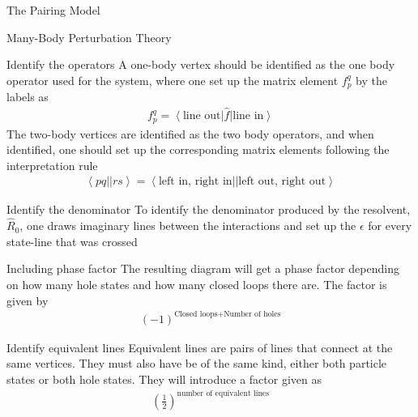 \documentclass[twoside,english]{uiofysmaster}
\begin{document}
\begin{chapter}{The Pairing Model}
\begin{section}{Many-Body Perturbation Theory}
		\begin{subsection}{Identify the operators}
			A one-body vertex should be identified as the one body operator used for the system, where one set up the matrix element $f_p^q$ by the labels as
			\begin{align}
				f_p^q = \left< \text{line out} \right| \hat f \left| \text{line in} \right>
			\end{align}
			The two-body vertices are identified as the two body operators, and when identified, one should set up the corresponding matrix elements following the interpretation rule
			\begin{align}
				\left< pq || rs \right> = \left< \text{left in, right in} || \text{left out, right out} \right> 
			\end{align}
		\end{subsection}

		\begin{subsection}{Identify the denominator}
			To identify the denominator produced by the resolvent, $\hat R_0$, one draws imaginary lines between the interactions and set up the $\epsilon$ for every state-line that was crossed 
		\end{subsection}

		\begin{subsection}{Including phase factor}
			The resulting diagram will get a phase factor depending on how many hole states and how many closed loops there are. The factor is given by 
			\begin{align}
				(-1)^{\text{Closed loops} + \text{Number of holes}}
			\end{align}
		\end{subsection}

		\begin{subsection}{Identify equivalent lines}
			Equivalent lines are pairs of lines that connect at the same vertices. They must also have be of the same kind, either both particle states or both hole states. They will introduce a factor given as 
			\begin{align}
				\left( \frac{1}{2} \right)^{\text{number of equivalent lines}}
			\end{align}
		\end{subsection}


\end{section}
\end{chapter}
\end{document}
